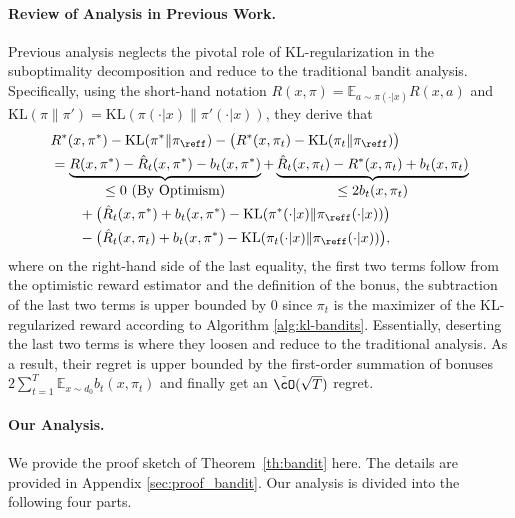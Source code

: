 \documentclass[11pt]{article}
\newcommand{\E}{\mathbb E}
\newcommand{\KL}{\mathrm{KL}}
\begin{document}
\paragraph{Review of Analysis in Previous Work.} 
Previous analysis \citep{xiong2024iterative,ye2024theoretical,song2024importance} neglects the pivotal role of KL-regularization in the suboptimality decomposition and reduce to the traditional bandit analysis. Specifically, using the short-hand notation $R(x,\pi)=\E_{a\sim\pi(\cdot|x)}R(x,a)$ and $\KL(\pi\| \pi')=\KL(\pi(\cdot|x)\|\pi'(\cdot|x))$, they derive that
\begin{equation*}
\begin{aligned}
&R^*(x,\pi^*) - \KL(\pi^*\|\pi_\reff)- \big(R^*(x,\pi_t) - \KL(\pi_t\|\pi_\reff)\big)
    \notag\\
    &= \underbrace{R(x,\pi^*) - \hat{R}_t(x,\pi^*) - b_t(x,\pi^*)}_{\displaystyle{\le 0 ~\text{(By Optimism)}}} + \underbrace{\hat{R}_t(x,\pi_t) - R^*(x,\pi_t) + b_t(x,\pi_t)}_{\displaystyle{\le 2b_t(x,\pi_t)}}\notag\\
    &\qquad + \big(\hat R_t(x,\pi^*) + b_t(x,\pi^*) - \KL(\pi^*(\cdot|x)\|\pi_\reff(\cdot|x))\big) \notag\\
    &\qquad - \big(\hat R_t(x,\pi_t) + b_t(x,\pi^*) - \KL(\pi_t(\cdot|x)\|\pi_\reff(\cdot|x))\big),
    \label{eq:suboptimality-gap:loose}
\end{aligned}
\end{equation*}
where on the right-hand side of the last equality, the first two terms follow from the optimistic reward estimator and the definition of the bonus, the subtraction of the last two terms is upper bounded by $0$ since $\pi_t$ is the maximizer of the KL-regularized reward according to Algorithm \ref{alg:kl-bandits}. Essentially, deserting the last two terms is where they loosen and reduce to the traditional analysis. As a result, their regret is upper bounded by the first-order summation of bonuses $2\sum_{t=1}^T \E_{x\sim d_0} b_t(x,\pi_t)$ and finally get an $\tilde{\cO}(\sqrt{T})$ regret.

\paragraph{Our Analysis.}
We provide the proof sketch of Theorem~\ref{th:bandit} here. The details are provided in Appendix \ref{sec:proof_bandit}.
Our analysis is divided into the following four parts.
\end{document}
